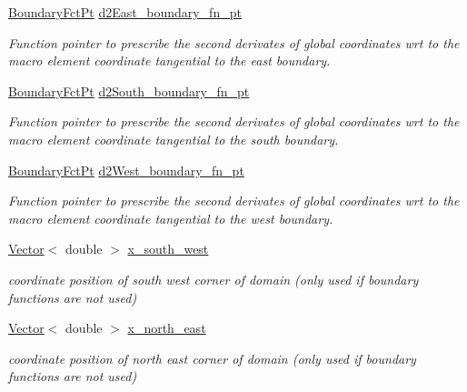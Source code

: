 \begin{DoxyCompactItemize}
\hyperlink{classoomph_1_1TopologicallyRectangularDomain_a8b2e24f5500d86c93aef509c5410e7cc}{Boundary\+Fct\+Pt} \hyperlink{classoomph_1_1TopologicallyRectangularDomain_a412d6225a5a6c3c55835e295e736d1c0}{d2\+East\+\_\+boundary\+\_\+fn\+\_\+pt}
\begin{DoxyCompactList}\small\item\em Function pointer to prescribe the second derivates of global coordinates wrt to the macro element coordinate tangential to the east boundary. \end{DoxyCompactList}\item 
\hyperlink{classoomph_1_1TopologicallyRectangularDomain_a8b2e24f5500d86c93aef509c5410e7cc}{Boundary\+Fct\+Pt} \hyperlink{classoomph_1_1TopologicallyRectangularDomain_a71020e52d5dd8cc0be51b9b466a294dc}{d2\+South\+\_\+boundary\+\_\+fn\+\_\+pt}
\begin{DoxyCompactList}\small\item\em Function pointer to prescribe the second derivates of global coordinates wrt to the macro element coordinate tangential to the south boundary. \end{DoxyCompactList}\item 
\hyperlink{classoomph_1_1TopologicallyRectangularDomain_a8b2e24f5500d86c93aef509c5410e7cc}{Boundary\+Fct\+Pt} \hyperlink{classoomph_1_1TopologicallyRectangularDomain_a55aaf2cfce3da535d9dd9ac5e990be3b}{d2\+West\+\_\+boundary\+\_\+fn\+\_\+pt}
\begin{DoxyCompactList}\small\item\em Function pointer to prescribe the second derivates of global coordinates wrt to the macro element coordinate tangential to the west boundary. \end{DoxyCompactList}\item 
\hyperlink{classoomph_1_1Vector}{Vector}$<$ double $>$ \hyperlink{classoomph_1_1TopologicallyRectangularDomain_a2e58acf65777d33e580b4953b7753b45}{x\+\_\+south\+\_\+west}
\begin{DoxyCompactList}\small\item\em coordinate position of south west corner of domain (only used if boundary functions are not used) \end{DoxyCompactList}\item 
\hyperlink{classoomph_1_1Vector}{Vector}$<$ double $>$ \hyperlink{classoomph_1_1TopologicallyRectangularDomain_aea8383a0d263080b49c3cbaee4af7833}{x\+\_\+north\+\_\+east}
\begin{DoxyCompactList}\small\item\em coordinate position of north east corner of domain (only used if boundary functions are not used) \end{DoxyCompactList}\end{DoxyCompactItemize}
